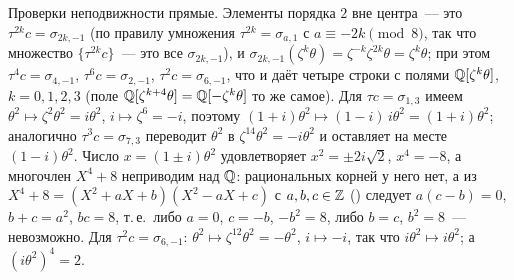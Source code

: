 Проверки неподвижности прямые. Элементы порядка $2$ вне центра~--- это $\tau^{2k}c=\sigma_{2k,-1}$ (по правилу умножения
$\tau^{2k}=\sigma_{a,1}$ с $a\equiv-2k\pmod 8$, так что множество $\{\tau^{2k}c\}$~--- это все $\sigma_{2k,-1}$), и
$\sigma_{2k,-1}(\zeta^k\theta)=\zeta^{-k}\zeta^{2k}\theta=\zeta^k\theta$; при этом $\tau^4c=\sigma_{4,-1}$, $\tau^6c=\sigma_{2,-1}$,
$\tau^2c=\sigma_{6,-1}$, что и даёт четыре строки с полями $\mathbb Q[\zeta^k\theta]$, $k=0,1,2,3$ (поле $\mathbb Q[\zeta^{k+4}\theta]=\mathbb Q[-\zeta^k\theta]$
то же самое). Для $\tau c=\sigma_{1,3}$ имеем $\theta^2\mapsto\zeta^2\theta^2=i\theta^2$, $i\mapsto\zeta^6=-i$, поэтому
$(1+i)\theta^2\mapsto(1-i)\,i\theta^2=(1+i)\theta^2$; аналогично $\tau^3c=\sigma_{7,3}$ переводит $\theta^2$ в $\zeta^{14}\theta^2=-i\theta^2$
и оставляет на месте $(1-i)\theta^2$. Число $x=(1\pm i)\theta^2$ удовлетворяет $x^2=\pm2i\sqrt2$, $x^4=-8$, а многочлен $X^4+8$
неприводим над $\mathbb Q$: рациональных корней у него нет, а из $X^4+8=(X^2+aX+b)(X^2-aX+c)$ с $a,b,c\in\mathbb Z$ () следует
$a(c-b)=0$, $b+c=a^2$, $bc=8$, т.\,е.\ либо $a=0$, $c=-b$, $-b^2=8$, либо $b=c$, $b^2=8$~--- невозможно. Для $\tau^2c=\sigma_{6,-1}$:
$\theta^2\mapsto\zeta^{12}\theta^2=-\theta^2$, $i\mapsto-i$, так что $i\theta^2\mapsto i\theta^2$; а $(i\theta^2)^4=2$.

